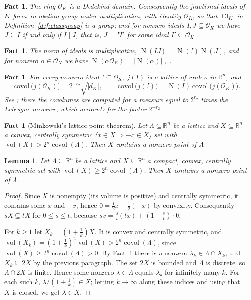 \documentclass[11pt]{amsart}
\newtheorem{lemma}[theorem]{Lemma}
\newtheorem{fact}[theorem]{Fact}
\theoremstyle{definition}
\theoremstyle{remark}
\newcommand{\R}{\mathbb{R}}
\newcommand{\OK}{\mathcal{O}_K}
\newcommand{\Cl}{\operatorname{Cl}}
\newcommand{\Nm}{\operatorname{N}}
\newcommand{\vol}{\operatorname{vol}}
\newcommand{\covol}{\operatorname{covol}}
\begin{document}
\begin{fact}\label{fact:dedekind}
The ring $\OK$ is a Dedekind domain. Consequently the fractional ideals of $K$
form an abelian group under multiplication, with identity $\OK$, so that
$\Cl_K$ in Definition~\ref{def:classgroup} is a group; and for nonzero ideals
$I, J \subseteq \OK$ we have $J \subseteq I$ if and only if $I \mid J$, that
is, $J = I I'$ for some ideal $I' \subseteq \OK$ \cite[Ch.~3]{Mar}.
\end{fact}

\begin{fact}\label{fact:norm}
The norm of ideals is multiplicative, $\Nm(IJ) = \Nm(I)\Nm(J)$, and for
nonzero $\alpha \in \OK$ we have $\Nm(\alpha\OK) = |\Nm(\alpha)|$
\cite[Ch.~3]{Mar}, \cite[Ch.~I, \S6]{Neu}.
\end{fact}

\begin{fact}\label{fact:covolume}
For every nonzero ideal $I \subseteq \OK$, $j(I)$ is a lattice of rank $n$ in
$\R^n$, and
\[
  \covol\bigl(j(\OK)\bigr) = 2^{-r_2} \sqrt{|d_K|}, \qquad
  \covol\bigl(j(I)\bigr) = \Nm(I) \covol\bigl(j(\OK)\bigr).
\]
See \cite[Ch.~I, \S5]{Neu}; there the covolumes are computed for a measure
equal to $2^{r_2}$ times the Lebesgue measure, which accounts for the factor
$2^{-r_2}$.
\end{fact}

\begin{fact}[Minkowski's lattice point theorem]\label{fact:minkowski}
Let $\Lambda \subseteq \R^n$ be a lattice and $X \subseteq \R^n$ a convex,
centrally symmetric ($x \in X \Rightarrow -x \in X$) set with
$\vol(X) > 2^n \covol(\Lambda)$. Then $X$ contains a nonzero point of
$\Lambda$ \cite[Ch.~I, \S4]{Neu}.
\end{fact}

\begin{lemma}\label{lem:minkowski-compact}
Let $\Lambda \subseteq \R^n$ be a lattice and $X \subseteq \R^n$ a compact,
convex, centrally symmetric set with $\vol(X) \geq 2^n \covol(\Lambda)$. Then
$X$ contains a nonzero point of $\Lambda$.
\end{lemma}

\begin{proof}
Since $X$ is nonempty (its volume is positive) and centrally symmetric, it
contains some $x$ and $-x$, hence $0 = \tfrac12 x + \tfrac12(-x)$ by
convexity. Consequently $sX \subseteq tX$ for $0 \leq s \leq t$, because
$sx = \tfrac{s}{t}(tx) + (1 - \tfrac{s}{t}) \cdot 0$.

For $k \geq 1$ let $X_k = (1 + \tfrac1k)X$. It is convex and centrally
symmetric, and $\vol(X_k) = (1 + \tfrac1k)^n \vol(X) > 2^n \covol(\Lambda)$,
since $\vol(X) \geq 2^n\covol(\Lambda) > 0$. By Fact~\ref{fact:minkowski}
there is a nonzero $\lambda_k \in \Lambda \cap X_k$, and
$X_k \subseteq 2X$ by the previous paragraph. The set $2X$ is bounded and
$\Lambda$ is discrete, so $\Lambda \cap 2X$ is finite. Hence some nonzero
$\lambda \in \Lambda$ equals $\lambda_k$ for infinitely many $k$. For each
such $k$, $\lambda/(1 + \tfrac1k) \in X$; letting $k \to \infty$ along these
indices and using that $X$ is closed, we get $\lambda \in X$.
\end{proof}
\end{document}
